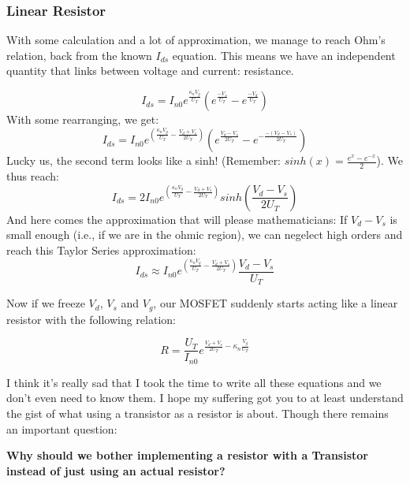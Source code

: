\subsubsection{Linear Resistor}

With some calculation and a lot of approximation, we manage to reach Ohm's relation, back from the known $I_{ds}$ equation. This means we have an independent quantity that links between voltage and current: resistance.  

\begin{equation}
I_{ds} = I_{n0} e^{\frac{\kappa_{n}V_g}{U_T}}(e^\frac{-V_s}{U_T} - e^\frac{-V_d}{U_T})
\end{equation}
With some rearranging, we get: 
\begin{equation}
I_{ds} = I_{n0} e^{(\frac{\kappa_n V_g}{U_T}-\frac{V_d + V_s}{2U_T})}(e^{\frac{V_d - V_s}{2U_T}} - e^{-\frac{-(V_d - V_s)}{2U_T}})
\end{equation}
Lucky us, the second term looks like a sinh! (Remember: $sinh(x) = \frac{e^x - e^{-x}}{2}$). 
We thus reach: 
\begin{equation}
I_{ds} = 2I_{n0} e^{(\frac{\kappa_n V_g}{U_T}-\frac{V_d + V_s}{2U_T})}sinh(\frac{V_d - V_s}{2U_T})
\end{equation}
And here comes the approximation that will please mathematicians: If $V_d - V_s$ is small enough (i.e., if we are in the ohmic region), we can negelect high orders and reach this Taylor Series approximation: 
\begin{equation}
I_{ds} \approx  I_{n0} e^{(\frac{\kappa_n V_g}{U_T}-\frac{V_d + V_s}{2U_T})}\frac{V_d - V_s}{U_T}
\end{equation}

Now if we freeze $V_d$, $V_s$ and $V_g$, our MOSFET suddenly starts acting like a linear resistor with the following relation: 

\begin{equation}
R = \frac{U_T}{I_{n0}}e^{\frac{V_d + V_s}{2U_T} - \kappa_n \frac{V_g}{U_T}}
\end{equation}

I think it's really sad that I took the time to write all these equations and we don't even need to know them. I hope my suffering got you to at least understand the gist of what using a transistor as a resistor is about. Though there remains an important question: 

\textbf{Why should we bother implementing a resistor with a Transistor instead of just using an actual resistor?}

